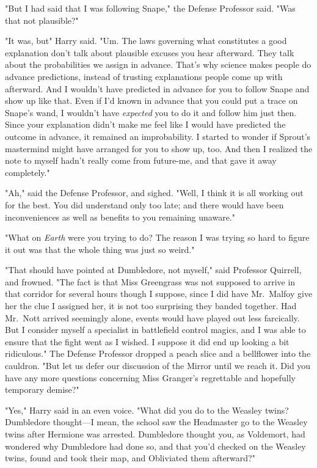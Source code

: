 "But I had said that I was following Snape," the Defense Professor said. "Was
that not plausible?"

"It was, but{\el}" Harry said. "Um. The laws governing what constitutes a
good explanation don't talk about plausible excuses you hear afterward. They
talk about the probabilities we assign in advance. That's why science makes
people do advance predictions, instead of trusting explanations people come up
with afterward. And I wouldn't have predicted in advance for you to follow
Snape and show up like that. Even if I'd known in advance that you could put a
trace on Snape's wand, I wouldn't have \emph{expected} you to do it and follow
him just then. Since your explanation didn't make me feel like I would have
predicted the outcome in advance, it remained an improbability. I started to
wonder if Sprout's mastermind might have arranged for you to show up, too. And
then I realized the note to myself hadn't really come from future-me, and that
gave it away completely."

"Ah," said the Defense Professor, and sighed. "Well, I think it is all working
out for the best. You did understand only too late; and there would have been
inconveniences as well as benefits to you remaining unaware."

"What on \emph{Earth} were you trying to do? The reason I was trying so hard to
figure it out was that the whole thing was just so weird."

"That should have pointed at Dumbledore, not myself," said Professor Quirrell,
and frowned. "The fact is that Miss Greengrass was not supposed to arrive in
that corridor for several hours{\el} though I suppose, since I did have
Mr.~Malfoy give her the clue I assigned her, it is not too surprising they
banded together. Had Mr.~Nott arrived seemingly alone, events would have played
out less farcically. But I consider myself a specialist in battlefield control
magics, and I was able to ensure that the fight went as I wished. I suppose it
did end up looking a bit ridiculous." The Defense Professor dropped a peach
slice and a bellflower into the cauldron. "But let us defer our discussion of
the Mirror until we reach it. Did you have any more questions concerning Miss
Granger's regrettable and hopefully temporary demise?"

"Yes," Harry said in an even voice. "What did you do to the Weasley twins?
Dumbledore thought---I mean, the school saw the Headmaster go to the Weasley
twins after Hermione was arrested. Dumbledore thought you, as Voldemort, had
wondered why Dumbledore had done so, and that you'd checked on the Weasley
twins, found and took their map, and Obliviated them afterward?"

